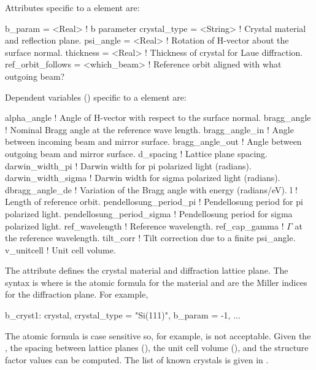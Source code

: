 Attributes specific to a  element are:
\begin{example}
  b_param            = <Real>       ! b parameter
  crystal_type       = <String>     ! Crystal material and reflection plane.
  psi_angle          = <Real>       ! Rotation of H-vector about the surface normal.
  thickness          = <Real>       ! Thickness of crystal for Laue diffraction.
  ref_orbit_follows  = <which_beam> ! Reference orbit aligned with what outgoing beam?
\end{example}

Dependent variables () specific to a  element are:
\begin{example}
  alpha_angle                ! Angle of H-vector with respect to the surface normal.
  bragg_angle                ! Nominal Bragg angle at the reference wave length. 
  bragg_angle_in             ! Angle between incoming beam and mirror surface.
  bragg_angle_out            ! Angle between outgoing beam and mirror surface.
  d_spacing                  ! Lattice plane spacing. 
  darwin_width_pi            ! Darwin width for pi polarized light (radians).
  darwin_width_sigma         ! Darwin width for sigma polarized light (radians).
  dbragg_angle_de            ! Variation of the Bragg angle with energy (radians/eV).
  l                          ! Length of reference orbit.
  pendellosung_period_pi     ! Pendellosung period for pi polarized light.
  pendellosung_period_sigma  ! Pendellosung period for sigma polarized light.
  ref_wavelength             ! Reference wavelength.
  ref_cap_gamma              ! \(\Gamma\) at the reference wavelength.
  tilt_corr                  ! Tilt correction due to a finite psi_angle.
  v_unitcell                 ! Unit cell volume. 
\end{example}

The  attribute defines the crystal material and
diffraction lattice plane. The syntax is  where 
is the atomic formula for the material and  are the Miller
indices for the diffraction plane. For example,
\begin{example}
  b_cryst1: crystal, crystal_type = "Si(111)", b_param = -1, ...
\end{example}
The atomic formula is case sensitive so, for example, 
is not acceptable.  Given the , the spacing between
lattice planes (), the unit cell volume
(), and the structure factor\cite{b:batterman} values
can be computed. The list of known crystals is given in
.

